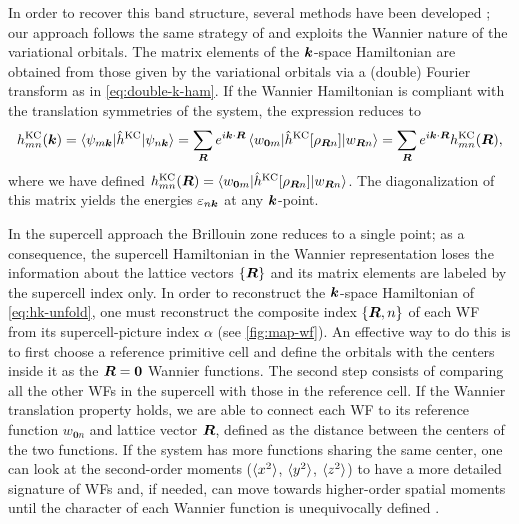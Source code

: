 In order to recover this band structure, several methods have been developed \cite{boykin_practical_2005, lee_band_2005, ku_unfolding_2010, popescu_extracting_2012, huang_general_2014, medeiros_effects_2014, zheng_quantum_2015}; our approach follows the same strategy of \cite{lee_band_2005} and exploits the Wannier nature of the variational orbitals. The matrix elements of the ${\bm k}$-space Hamiltonian are obtained from those given by the variational orbitals via a (double) Fourier transform as in \cref{eq:double-k-ham}. If the Wannier Hamiltonian is compliant with the translation symmetries of the system, the expression reduces to
%
\begin{equation}
    h^{\rm KC}_{mn}({\bm k}) = \braket{\psi_{m{\bm k}} | \hat{h}^{\rm KC} | \psi_{n{\bm k}}} = \sum_{{\bm R}} e^{i {\bm k} \cdot {\bm R}} \braket{w_{\bm{0}m} | \hat{h}^{\rm KC}[\rho_{{\bm R} n}] | w_{{\bm R} n}} = \sum_{{\bm R}} e^{i {\bm k} \cdot {\bm R}} h^{\rm KC}_{mn}({\bm R}) ,
    \label{eq:hk-unfold}
\end{equation}
%
where we have defined $h^{\rm KC}_{mn}({\bm R}) = \braket{w_{\bm{0}m} | \hat{h}^{\rm KC}[\rho_{{\bm R} n}] | w_{{\bm R} n}}$. The diagonalization of this matrix yields the energies $\varepsilon_{n{\bm k}}$ at any ${\bm k}$-point.

In the supercell approach the Brillouin zone reduces to a single point; as a consequence, the supercell Hamiltonian in the Wannier representation loses the information about the lattice vectors $\{{\bm R}\}$ and its matrix elements are labeled by the supercell index only. In order to reconstruct the ${\bm k}$-space Hamiltonian of \cref{eq:hk-unfold}, one must reconstruct the composite index $\{{\bm R},n\}$ of each WF from its supercell-picture index ${\alpha}$ (see \cref{fig:map-wf}). An effective way to do this is to first choose a reference primitive cell and define the orbitals with the centers inside it as the ${\bm R}=\bm{0}$ Wannier functions. The second step consists of comparing all the other WFs in the supercell with those in the reference cell. If the Wannier translation property holds, we are able to connect each WF to its reference function $w_{\bm{0} n}$ and lattice vector ${\bm R}$, defined as the distance between the centers of the two functions. If the system has more functions sharing the same center, one can look at the second-order moments ($\braket{x^2}$, $\braket{y^2}$, $\braket{z^2}$) to have a more detailed signature of WFs and, if needed, can move towards higher-order spatial moments until the character of each Wannier function is unequivocally defined \cite{shelley_automated_2011}.

